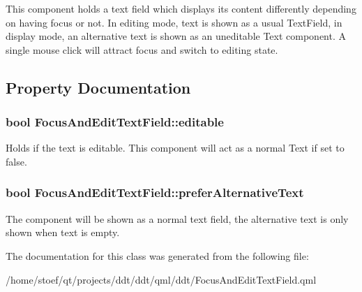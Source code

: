 This component holds a text field which displays its content differently depending on having focus or not. In editing mode, text is shown as a usual {\ttfamily Text\-Field}, in display mode, an alternative text is shown as an uneditable {\ttfamily Text} component. A single mouse click will attract focus and switch to editing state. 

\subsection{Property Documentation}
\hypertarget{classFocusAndEditTextField_af9099a4508112eccd7f6b0aea8cd3970}{
\subsubsection[{editable}]{\setlength{\rightskip}{0pt plus 5cm}bool Focus\-And\-Edit\-Text\-Field\-::editable}}\label{classFocusAndEditTextField_af9099a4508112eccd7f6b0aea8cd3970}
Holds if the text is editable. This component will act as a normal {\ttfamily Text} if set to {\ttfamily false}. \hypertarget{classFocusAndEditTextField_ae40af8644ebd8001c47648f0934b0030}{
\subsubsection[{prefer\-Alternative\-Text}]{\setlength{\rightskip}{0pt plus 5cm}bool Focus\-And\-Edit\-Text\-Field\-::prefer\-Alternative\-Text}}\label{classFocusAndEditTextField_ae40af8644ebd8001c47648f0934b0030}
The component will be shown as a normal text field, the alternative text is only shown when {\ttfamily text} is empty. 

The documentation for this class was generated from the following file\-:\begin{DoxyCompactItemize}
\item 
/home/stoef/qt/projects/ddt/ddt/qml/ddt/Focus\-And\-Edit\-Text\-Field.\-qml\end{DoxyCompactItemize}
